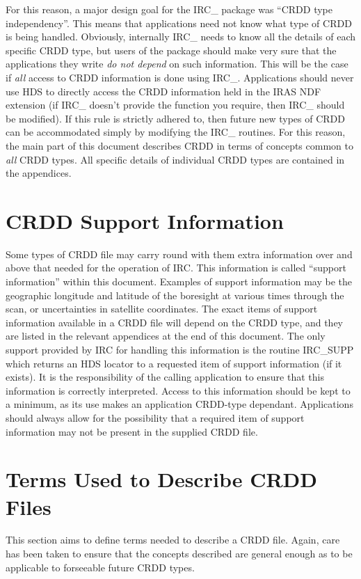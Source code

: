 For this reason, a major design goal for the IRC\_ package was ``CRDD type
independency''. This means that applications need not know what type of CRDD is
being handled. Obviously, internally IRC\_ needs to know all the details of each
specific CRDD type, but users of the package should make very sure that the
applications they write {\em do not depend } on such information. This will be
the case if {\em all} access to CRDD information is done using IRC\_. Applications
should never use HDS to directly access the CRDD information held in the IRAS
NDF extension (if IRC\_ doesn't provide the function you require, then IRC\_
should be modified). If this rule is strictly adhered to, then future new types
of CRDD can be accommodated simply by modifying the IRC\_ routines. For this
reason, the main part of this document describes CRDD in terms of concepts
common to {\em all} CRDD types. All specific details of individual CRDD types
are contained in the appendices.

\section {CRDD Support Information}
\label {SEC:SUPP}
Some types of CRDD file may carry round with them extra information over and
above that needed for the operation of IRC. This information is called ``support
information'' within this document. Examples of support information may be the
geographic longitude and latitude of the boresight at various times through the
scan, or uncertainties in satellite coordinates. The exact items of support
information available in a CRDD file will depend on the CRDD type, and they are
listed in the relevant appendices at the end of this document. The only support
provided by IRC for handling this information is the routine IRC\_SUPP which
returns an HDS locator to a requested item of support information (if it
exists). It is the responsibility of the calling application to ensure that this
information is correctly interpreted. Access to this information should be kept
to a minimum, as its use makes an application CRDD-type dependant. Applications
should always allow for the possibility that a required item of support
information may not be present in the supplied CRDD file.

\section {Terms Used to Describe CRDD Files}
\label {SEC:TERMS}
This section aims to define terms needed to describe a CRDD file. Again, care
has been taken to ensure that the concepts described are general enough
as to be applicable to forseeable future CRDD types.

